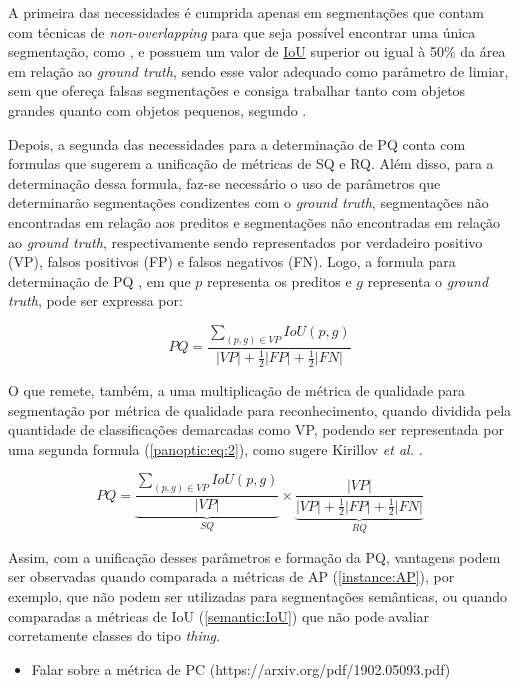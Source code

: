 A primeira das necessidades é cumprida apenas em segmentações que contam com técnicas de \textit{non-overlapping} para que seja possível encontrar uma única segmentação, como \cite{Neubeck2006}, e possuem um valor de \hyperref[semantic:IoU]{IoU} superior ou igual à 50\% da área em relação ao \textit{ground truth}, sendo esse valor adequado como parâmetro de limiar, sem que ofereça falsas segmentações e consiga trabalhar tanto com objetos grandes quanto com objetos pequenos, segundo \cite{Kirillov2019a}.

Depois, a segunda das necessidades para a determinação de PQ conta com formulas que sugerem a unificação de métricas de SQ e RQ. Além disso, para a determinação dessa formula, faz-se necessário o uso de parâmetros que determinarão segmentações condizentes com o \textit{ground truth}, segmentações não encontradas em relação aos preditos e segmentações não encontradas em relação ao \textit{ground truth}, respectivamente sendo representados por verdadeiro positivo (VP), falsos positivos (FP) e falsos negativos (FN). Logo, a formula para determinação de PQ \cite{Kirillov2019a}, em que $p$ representa os preditos e $g$ representa o \textit{ground truth}, pode ser expressa por:

\begin{equation}
\label{panoptic:eq:1}
    PQ = \frac{\sum _{(p,g) \in VP} IoU(p,g)}{|VP|+ \frac{1}{2}|FP| + \frac{1}{2}|FN|}
\end{equation}

O que remete, também, a uma multiplicação de métrica de qualidade para segmentação por métrica de qualidade para reconhecimento, quando dividida pela quantidade de classificações demarcadas como VP, podendo ser representada por uma segunda formula (\ref{panoptic:eq:2}), como sugere Kirillov \textit{et al.} \cite{Kirillov2019a}.

\begin{equation}
\label{panoptic:eq:2}
   PQ = \underbrace{\frac{\sum _{(p,g) \in VP} IoU(p,g)}{|VP|}}_{SQ} \times \underbrace{\frac{|VP|}{|VP|+ \frac{1}{2}|FP| + \frac{1}{2}|FN|}}_{RQ}
\end{equation}

Assim, com a unificação desses parâmetros e formação da PQ, vantagens podem ser observadas quando comparada a métricas de AP (\ref{instance:AP}), por exemplo, que não podem ser utilizadas para segmentações semânticas, ou quando comparadas a métricas de IoU (\ref{semantic:IoU}) que não pode avaliar corretamente classes do tipo \textit{thing}.
\begin{itemize}
 \item Falar sobre a métrica de PC (https://arxiv.org/pdf/1902.05093.pdf)
\end{itemize}

